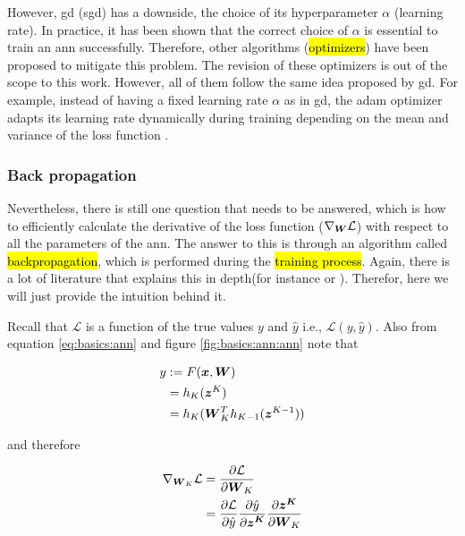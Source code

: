 However, \gls{gd} (\gls{sgd}) has a downside, the choice of its hyperparameter $\alpha$ (learning rate). In practice, it has been shown that the correct choice of $\alpha$ is essential to train an \gls{ann} successfully. Therefore, other algorithms (\hl{optimizers}) have been proposed to mitigate this problem. The revision of these optimizers is out of the scope to this work. However, all of them follow the same idea proposed by \gls{gd}. For example, instead of having a fixed learning rate $\alpha$ as in \gls{gd}, the \gls{adam} optimizer adapts its learning rate dynamically during training depending on the mean and variance of the loss function \cite{kingma2014adam}.

\subsubsection{Back propagation}

Nevertheless, there is still one question that needs to be answered, which is how to efficiently calculate the derivative of the loss function ($\nabla_{\boldsymbol{W}} \mathcal{L}$) with respect to all the parameters of the \gls{ann}. The answer to this is through an algorithm called \hl{backpropagation}, which is performed during the \hl{training process}. Again, there is a lot of literature that explains this in depth(for instance \cite{Goodfellow-et-al-2016} or \cite{bishop2006pattern}). Therefor, here we will just provide the intuition behind it.

Recall that $\mathcal{L}$ is a function of the true values $y$ and $\hat{y}$ i.e., $\mathcal{L}(y, \hat{y})$. Also from equation \ref{eq:basics:ann} and figure \ref{fig:basics:ann:ann} note that

\begin{equation}
  \begin{split}
    y &:= F(\boldsymbol{x}, \boldsymbol{W}) \\
    &= h_K(\boldsymbol{z}^K) \\
    &= h_K(\boldsymbol{W}_K^T h_{K-1}(\boldsymbol{z}^{K-1}))
  \end{split}
  \label{eq:basics:ann:backprop_1}
\end{equation}

and therefore

\begin{equation}
  \begin{split}
    \nabla_{\boldsymbol{W}_K} \mathcal{L} &= \frac{\partial \mathcal{L}}{\partial \boldsymbol{W}_K} \\
    &= \frac{\partial \mathcal{L}}{\partial \hat{y}}
    \frac{\partial \hat{y}}{\partial \boldsymbol{z^K}}
    \frac{\partial \boldsymbol{z^K}}{\partial \boldsymbol{W}_K} \\
  \end{split}
  \label{eq:basics:ann:backprop_2}
\end{equation}

